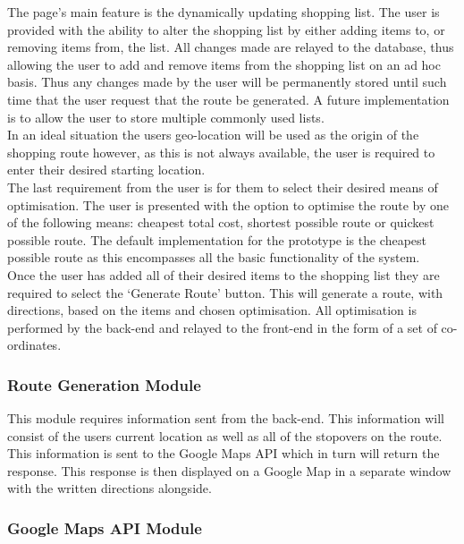 \documentclass[10pt,twocolumn]{witseiepaper}
\begin{document}
		The page's main feature is the dynamically updating shopping list. The user is provided with the ability to alter the shopping list by either adding items to, or removing items from, the list. All changes made are relayed to the database, thus allowing the user to add and remove items from the shopping list on an ad hoc basis. Thus any changes made by the user will be permanently stored until such time that the user request that the route be generated. A future implementation is to allow the user to store multiple commonly used lists. \\
		
		In an ideal situation the users geo-location will be used as the origin of the shopping route however, as this is not always available, the user is required to enter their desired starting location.\\
		
		The last requirement from the user is for them to select their desired means of optimisation. The user is presented with the option to optimise the route by one of the following means: cheapest total cost, shortest possible route or quickest possible route. The default implementation for the prototype is the cheapest possible route as this encompasses all the basic functionality of the system. \\
		
		Once the user has added all of their desired items to the shopping list they are required to select the `Generate Route' button. This will generate a route, with directions, based on the items and chosen optimisation. All optimisation is performed by the back-end and relayed to the front-end in the form of a set of co-ordinates.
		
		\subsubsection{Route Generation Module}
		
		This module requires information sent from the back-end. This information will consist of the users current location as well as all of the stopovers on the route. This information is sent to the Google Maps API which in turn will return the response. This response is then displayed on a Google Map in a separate window with the written directions alongside.
		
		\subsubsection{Google Maps API Module}
		
\end{document}
